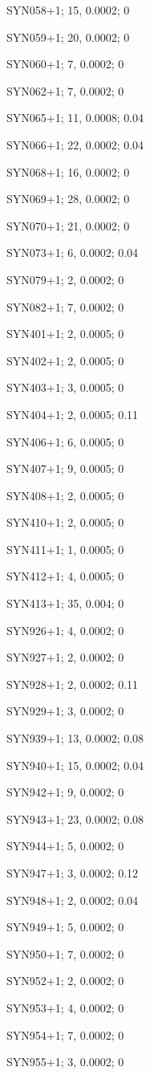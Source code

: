 SYN058+1; 15, 0.0002; 0

SYN059+1; 20, 0.0002; 0

SYN060+1; 7, 0.0002; 0

SYN062+1; 7, 0.0002; 0

SYN065+1; 11, 0.0008; 0.04

SYN066+1; 22, 0.0002; 0.04

SYN068+1; 16, 0.0002; 0

SYN069+1; 28, 0.0002; 0

SYN070+1; 21, 0.0002; 0

SYN073+1; 6, 0.0002; 0.04

SYN079+1; 2, 0.0002; 0

SYN082+1; 7, 0.0002; 0

SYN401+1; 2, 0.0005; 0

SYN402+1; 2, 0.0005; 0

SYN403+1; 3, 0.0005; 0

SYN404+1; 2, 0.0005; 0.11

SYN406+1; 6, 0.0005; 0

SYN407+1; 9, 0.0005; 0

SYN408+1; 2, 0.0005; 0

SYN410+1; 2, 0.0005; 0

SYN411+1; 1, 0.0005; 0

SYN412+1; 4, 0.0005; 0

SYN413+1; 35, 0.004; 0

SYN926+1; 4, 0.0002; 0

SYN927+1; 2, 0.0002; 0

SYN928+1; 2, 0.0002; 0.11

SYN929+1; 3, 0.0002; 0

SYN939+1; 13, 0.0002; 0.08

SYN940+1; 15, 0.0002; 0.04

SYN942+1; 9, 0.0002; 0

SYN943+1; 23, 0.0002; 0.08

SYN944+1; 5, 0.0002; 0

SYN947+1; 3, 0.0002; 0.12

SYN948+1; 2, 0.0002; 0.04

SYN949+1; 5, 0.0002; 0

SYN950+1; 7, 0.0002; 0

SYN952+1; 2, 0.0002; 0

SYN953+1; 4, 0.0002; 0

SYN954+1; 7, 0.0002; 0

SYN955+1; 3, 0.0002; 0

